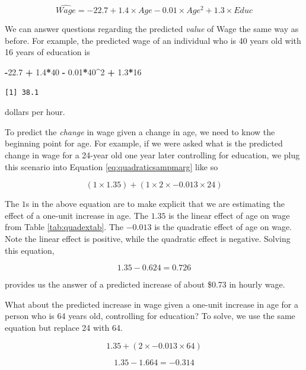 \documentclass[
]{book}
\makeatletter
\newenvironment{Shaded}{\begin{snugshade}}{\end{snugshade}}
\newcommand{\DecValTok}[1]{\textcolor[rgb]{0.06,0.06,0.06}{#1}}
\newcommand{\FloatTok}[1]{\textcolor[rgb]{0.06,0.06,0.06}{#1}}
\newcommand{\SpecialCharTok}[1]{\textcolor[rgb]{0.43,0.43,0.43}{\textbf{#1}}}
\newenvironment{kframe}{%
\medskip{}
\setlength{\fboxsep}{.8em}
 \def\at@end@of@kframe{}%
 \ifinner\ifhmode%
  \def\at@end@of@kframe{\end{minipage}}%
  \begin{minipage}{\columnwidth}%
 \fi\fi%
 \def\FrameCommand##1{\hskip\@totalleftmargin \hskip-\fboxsep
 \colorbox{shadecolor}{##1}\hskip-\fboxsep
     \hskip-\linewidth \hskip-\@totalleftmargin \hskip\columnwidth}%
 \MakeFramed {\advance\hsize-\width
   \@totalleftmargin\z@ \linewidth\hsize
   \@setminipage}}%
 {\par\unskip\endMakeFramed%
 \at@end@of@kframe}
\renewenvironment{Shaded}{\begin{kframe}}{\end{kframe}}
\makeatother
\begin{document}
\begin{equation}
\hat{Wage} = -22.7 + 1.4\times Age - 0.01\times Age^2 + 1.3\times Educ
\label{eq:quadraticexsamp}
\end{equation}

We can answer questions regarding the predicted \emph{value} of Wage the same way as before. For example, the predicted wage of an individual who is 40 years old with 16 years of education is

\begin{Shaded}
\begin{Highlighting}[]
\SpecialCharTok{{-}}\FloatTok{22.7} \SpecialCharTok{+} \FloatTok{1.4}\SpecialCharTok{*}\DecValTok{40} \SpecialCharTok{{-}} \FloatTok{0.01}\SpecialCharTok{*}\DecValTok{40}\SpecialCharTok{\^{}}\DecValTok{2} \SpecialCharTok{+} \FloatTok{1.3}\SpecialCharTok{*}\DecValTok{16}
\end{Highlighting}
\end{Shaded}

\begin{verbatim}
[1] 38.1
\end{verbatim}

dollars per hour.

To predict the \emph{change} in wage given a change in age, we need to know the beginning point for age. For example, if we were asked what is the predicted change in wage for a 24-year old one year later controlling for education, we plug this scenario into Equation \eqref{eq:quadraticsampmarg} like so

\[(1 \times 1.35) + (1 \times 2 \times -0.013 \times 24)\]

The \(1\)s in the above equation are to make explicit that we are estimating the effect of a one-unit increase in age. The \(1.35\) is the linear effect of age on wage from Table \ref{tab:quadextab}. The \(-0.013\) is the quadratic effect of age on wage. Note the linear effect is positive, while the quadratic effect is negative. Solving this equation,

\[1.35 - 0.624 = 0.726\]

provides us the answer of a predicted increase of about \$0.73 in hourly wage.

What about the predicted increase in wage given a one-unit increase in age for a person who is 64 years old, controlling for education? To solve, we use the same equation but replace 24 with 64.

\[1.35 + (2 \times -0.013 \times 64)\]

\[1.35 - 1.664 = -0.314\]
\end{document}
